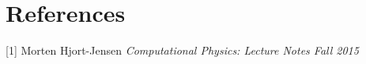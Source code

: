 \documentclass[10pt,a4paper]{article}
\begin{document}
\section{References}
[1] Morten Hjort-Jensen \textit{Computational Physics: Lecture Notes Fall 2015}

\end{document}
